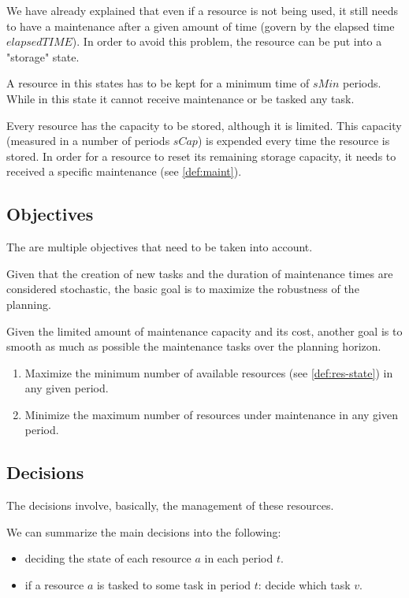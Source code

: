 \documentclass{roadef}
\begin{document}
    We have already explained that even if a resource is not being used, it still needs to have a maintenance after a given amount of time (govern by the elapsed time $elapsedTIME$). In order to avoid this problem, the resource can be put into a "storage" state.

    A resource in this states has to be kept for a minimum time of $sMin$ periods. While in this state it cannot receive maintenance or be tasked any task.

    Every resource has the capacity to be stored, although it is limited. This capacity (measured in a number of periods $sCap$) is expended every time the resource is stored. In order for a resource to reset its remaining storage capacity, it needs to received a specific maintenance (see \ref{def:maint}).

    \subsection{Objectives}
    
    The are multiple objectives that need to be taken into account. 

    Given that the creation of new tasks and the duration of maintenance times are considered stochastic, the basic goal is to maximize the robustness of the planning. 

    Given the limited amount of maintenance capacity and its cost, another goal is to smooth as much as possible the maintenance tasks over the planning horizon.

    \begin{enumerate}
        \item Maximize the minimum number of available resources (see \ref{def:res-state}) in any given period.
        \item Minimize the maximum number of resources under maintenance in any given period.
    \end{enumerate}

    \subsection{Decisions}

    The decisions involve, basically, the management of these resources. 

    We can summarize the main decisions into the following:

    \begin{itemize}
        \item deciding the state of each resource $a$ in each period $t$.
        \item if a resource $a$ is tasked to some task in period $t$: decide which task $v$.
    \end{itemize}
\end{document}
